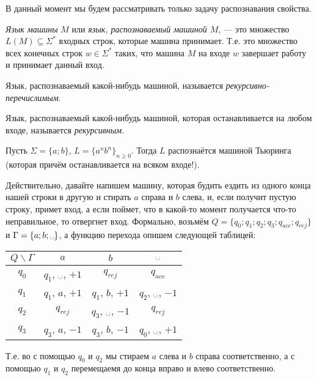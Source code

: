 \documentclass[12pt,a4paper]{article}
\newcommand{\spacesymbol}{\ensuremath{\text{\textvisiblespace}}}
\begin{document}
    \begin{remark*}
        В данный момент мы будем рассматривать только задачу распознавания свойства.
    \end{remark*}

    \begin{definition}
        \emph{Язык машины} $M$ или \emph{язык, распознаваемый машиной $M$,} --- это множество $L(M) \subseteq \Sigma^*$ входных строк, которые машина принимает. Т.е. это множество всех конечных строк $w \in \Sigma^*$ таких, что машина $M$ на входе $w$ завершает работу и принимает данный вход.

        Язык, распознаваемый какой-нибудь машиной, называется \emph{рекурсивно-перечислимым}.

        Язык, распознаваемый какой-нибудь машиной, которая останавливается на любом входе, называется \emph{рекурсивным}.
    \end{definition}

    \begin{example}
        Пусть $\Sigma = \{a; b\}$, $L = \{a^nb ^n\}_{n \geqslant 0}$. Тогда $L$ распознаётся машиной Тьюринга (которая причём останавливается на всяком входе!).

        Действительно, давайте напишем машину, которая будить ездить из одного конца нашей строки в другую и стирать $a$ справа и $b$ слева, и, если получит пустую строку, примет вход, а если поймет, что в какой-то момент получается что-то неправильное, то отвергнет вход. Формально, возьмём $Q = \{q_0; q_1; q_2; q_3; q_{acc}; q_{rej}\}$ и $\Gamma = \{a; b; \spacesymbol\}$, а функцию перехода опишем следующей таблицей:
        \begin{table}[H]
            \centering
            \begin{tabular}{c||c|c|c}
                $Q\backslash\Gamma$& $a$& $b$& $\spacesymbol$\\
                \hline
                \hline
                $q_0$& $q_1$, \spacesymbol, $+1$& $q_{rej}$& $q_{acc}$\\
                \hline
                $q_1$& $q_1$, $a$, $+1$& $q_1$, $b$, $+1$& $q_2$, \spacesymbol, $-1$\\
                \hline
                $q_2$& $q_{rej}$& $q_3$, \spacesymbol, $-1$& $q_{rej}$\\
                \hline
                $q_3$& $q_3$, $a$, $-1$& $q_3$, $b$, $-1$& $q_0$, \spacesymbol, $+1$\\
            \end{tabular}
        \end{table}
        Т.е. во с помощью $q_0$ и $q_2$ мы стираем $a$ слева и $b$ справа соответственно, а с помощью $q_1$ и $q_2$ перемещаемя до конца вправо и влево соответственно.
    \end{example}
\end{document}
